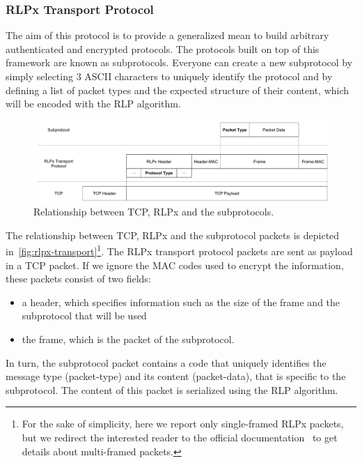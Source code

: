 \subsubsection{RLPx Transport Protocol}
\label{sec:rlpx-transport-protocol}

The aim of this protocol is to provide a generalized mean to build arbitrary
authenticated and encrypted protocols. The protocols built on top of this
framework are known as subprotocols. Everyone can create a new subprotocol by
simply selecting $3$ ASCII characters to uniquely identify the protocol and by
defining a list of packet types and the expected structure of their content,
which will be encoded with the RLP algorithm.

\begin{figure}
  \begin{center}
    \includegraphics[width=\textwidth]{./res/img/rlpx-transport}
    \caption{Relationship between TCP, RLPx and the subprotocols.}
    \label{fig:rlpx-transport}
  \end{center}
\end{figure}

The relationship between TCP, RLPx and the subprotocol packets is depicted
in~\autoref{fig:rlpx-transport}\footnote{For the sake of simplicity, here we
report only single-framed RLPx packets, but we redirect the interested reader to
the official documentation~\cite{rlpx} to get details about multi-framed
packets.}. The RLPx transport protocol packets are sent as payload in a TCP
packet. If we ignore the MAC codes used to encrypt the information, these
packets consist of two fields:
\begin{itemize}
  \item a header, which specifies information such as the size of the frame and
  the subprotocol that will be used
  \item the frame, which is the packet of the subprotocol.
\end{itemize}

In turn, the subprotocol packet contains a code that uniquely identifies the
message type (packet-type) and its content (packet-data), that is specific to
the subprotocol. The content of this packet is serialized using the RLP
algorithm.

